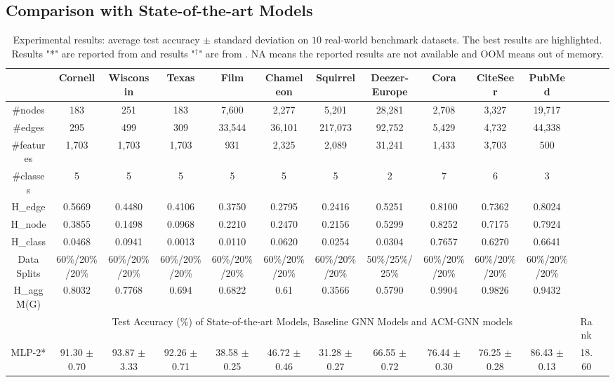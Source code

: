 \documentclass{article}
\newcommand{\0}{{\boldsymbol{0}}}
\newcommand{\6}{{\partial}}
\newcommand{\8}{{\infty}}
\newcommand{\4}{{\nabla}}
\begin{document}
\subsection{Comparison with State-of-the-art Models}
\label{sec:comparison_with_sota}
\begin{table}[htbp]
  \centering
  \tiny
  \setlength{\tabcolsep}{0.5pt}
  \caption{Experimental results: average test accuracy $\pm$ standard deviation on $10$ real-world benchmark datasets. The best results are highlighted. Results "*" are reported from \cite{chien2021adaptive,lim2021new} and results "$^\dagger$" are from \cite{pei2020geom}. NA means the reported results are not available and OOM means out of memory. }
\begin{tabular}{c|cccccccccc|cc}
    \toprule
    \toprule
         & Cornell & Wisconsin & Texas & Film  & Chameleon & Squirrel & Deezer-Europe & Cora  & CiteSeer & PubMed &  \\
    \midrule
    \#nodes & 183   & 251   & 183   & 7,600 & 2,277 & 5,201 & 28,281 & 2,708 & 3,327 & 19,717 &  \\
    \#edges & 295   & 499   & 309   & 33,544 & 36,101 & 217,073 & 92,752 & 5,429 & 4,732 & 44,338 &  \\
    \#features & 1,703 & 1,703 & 1,703 & 931   & 2,325 & 2,089 & 31,241 & 1,433 & 3,703 & 500   &  \\
    \#classes & 5     & 5     & 5     & 5     & 5     & 5     & 2     & 7     & 6     & 3     &  \\
    H\_edge & 0.5669 & 0.4480 & 0.4106 & 0.3750 & 0.2795 & 0.2416 & 0.5251 & 0.8100 & 0.7362 & 0.8024 &  \\
    H\_node & 0.3855 & 0.1498 & 0.0968 & 0.2210 & 0.2470 & 0.2156 & 0.5299 & 0.8252 & 0.7175 & 0.7924 &  \\
    H\_class & 0.0468 & 0.0941 & 0.0013 & 0.0110 & 0.0620 & 0.0254 & 0.0304 & 0.7657 & 0.6270 & 0.6641 &  \\
    Data Splits & 60\%/20\%/20\% & 60\%/20\%/20\% & 60\%/20\%/20\% & 60\%/20\%/20\% & 60\%/20\%/20\% & 60\%/20\%/20\% & 50\%/25\%/25\% & 60\%/20\%/20\% & 60\%/20\%/20\% & 60\%/20\%/20\% &  \\
    H\_agg\^M(G) & 0.8032 & 0.7768 & 0.694 & 0.6822 & 0.61  & 0.3566 & 0.5790 & 0.9904 & 0.9826 & 0.9432 &  \\
    \midrule
    \midrule
          & \multicolumn{10}{c|}{Test Accuracy (\%) of State-of-the-art Models, Baseline GNN Models and ACM-GNN models} & Rank \\
    \midrule
    MLP-2* & 91.30 $\pm$ 0.70 & 93.87 $\pm$ 3.33 & 92.26 $\pm$ 0.71 & 38.58 $\pm$ 0.25 & 46.72 $\pm$ 0.46 & 31.28 $\pm$ 0.27 & 66.55 $\pm$ 0.72 & 76.44 $\pm$ 0.30 & 76.25 $\pm$ 0.28 & 86.43 $\pm$ 0.13 & 18.60 \\

\end{tabular}
\end{table}
\end{document}
